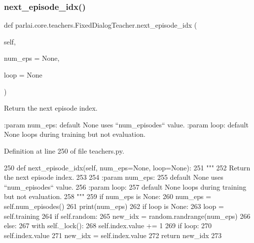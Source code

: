 \subsubsection{\texorpdfstring{next\+\_\+episode\+\_\+idx()}{next\_episode\_idx()}}
{\footnotesize\ttfamily def parlai.\+core.\+teachers.\+Fixed\+Dialog\+Teacher.\+next\+\_\+episode\+\_\+idx (\begin{DoxyParamCaption}\item[{}]{self,  }\item[{}]{num\+\_\+eps = {\ttfamily None},  }\item[{}]{loop = {\ttfamily None} }\end{DoxyParamCaption})}

\begin{DoxyVerb}Return the next episode index.

:param num_eps:
    default None uses ``num_episodes`` value.
:param loop:
    default None loops during training but not evaluation.
\end{DoxyVerb}
 

Definition at line 250 of file teachers.\+py.


\begin{DoxyCode}
250     \textcolor{keyword}{def }next\_episode\_idx(self, num\_eps=None, loop=None):
251         \textcolor{stringliteral}{"""}
252 \textcolor{stringliteral}{        Return the next episode index.}
253 \textcolor{stringliteral}{}
254 \textcolor{stringliteral}{        :param num\_eps:}
255 \textcolor{stringliteral}{            default None uses ``num\_episodes`` value.}
256 \textcolor{stringliteral}{        :param loop:}
257 \textcolor{stringliteral}{            default None loops during training but not evaluation.}
258 \textcolor{stringliteral}{        """}
259         \textcolor{keywordflow}{if} num\_eps \textcolor{keywordflow}{is} \textcolor{keywordtype}{None}:
260             num\_eps = self.num\_episodes()
261             print(num\_eps)
262         \textcolor{keywordflow}{if} loop \textcolor{keywordflow}{is} \textcolor{keywordtype}{None}:
263             loop = self.training
264         \textcolor{keywordflow}{if} self.random:
265             new\_idx = random.randrange(num\_eps)
266         \textcolor{keywordflow}{else}:
267             with self.\_lock():
268                 self.index.value += 1
269                 \textcolor{keywordflow}{if} loop:
270                     self.index.value %
271                 new\_idx = self.index.value
272         \textcolor{keywordflow}{return} new\_idx
273 
\end{DoxyCode}
\mbox{\label{classparlai_1_1core_1_1teachers_1_1FixedDialogTeacher_aa6782a610b00aa0675522aa58b03f20c}} 
